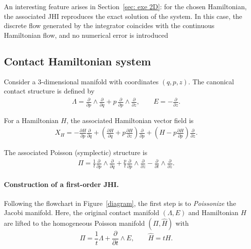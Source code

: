 \documentclass[12pt,english]{article}
\begin{document}
An interesting feature arises in Section~\ref{sec: exe 2D}: for the chosen Hamiltonian, the associated JHI reproduces the exact solution of the system. In this case, the discrete flow generated by the integrator coincides with the continuous Hamiltonian flow, and no numerical error is introduced


\subsection{Contact Hamiltonian system}\label{sec: exe contact}

Consider a 3-dimensional manifold with coordinates $(q,p,z)$. The canonical contact structure \cite{Simoes_2020} is defined by
\begin{align}\label{eq: contact bivetor field}
    \Lambda = \frac{\partial}{\partial p}\wedge \frac{\partial}{\partial q} + p\,\frac{\partial}{\partial p}\wedge \frac{\partial}{\partial z}, \qquad 
    E = -\frac{\partial}{\partial z}.
\end{align}

For a Hamiltonian $H$, the associated Hamiltonian vector field is
\begin{align*}
    X_H = -\frac{\partial H}{\partial p}\frac{\partial}{\partial q} 
          + \left(\frac{\partial H}{\partial q} + p \frac{\partial H}{\partial z}\right)\frac{\partial}{\partial p} 
          + \left(H - p \frac{\partial H}{\partial p}\right)\frac{\partial}{\partial z}.
\end{align*}

The associated Poisson (symplectic) structure is 
\begin{align}\label{eq: poisson - contact}
    \Pi = \frac{1}{t}\frac{\partial}{\partial p}\wedge \frac{\partial}{\partial q} + \frac{p}{t}\frac{\partial}{\partial p}\wedge \frac{\partial}{\partial z} - \frac{\partial}{\partial t}\wedge \frac{\partial}{\partial z}.
\end{align}

\paragraph{Construction of a first-order JHI.} Following the flowchart in Figure~\ref{diagram}, the first step is to \emph{Poissonize} the Jacobi manifold. Here, the original contact manifold $(\Lambda,E)$ and Hamiltonian $H$ are lifted to the homogeneous Poisson manifold $(\Pi, \hat{H})$ with 
\[
\Pi = \frac{1}{t}\Lambda + \frac{\partial}{\partial t}\wedge E, \qquad \hat{H} = t H.
\]
\end{document}
